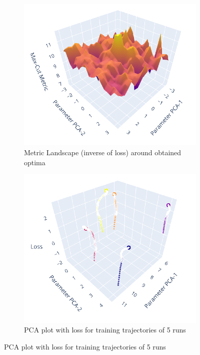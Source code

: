 \documentclass[%
 reprint,
 amsmath,
 amssymb,
 showkeys,
 pra,
 floatfix,
 onecolumn,
]{revtex4-2}
\begin{document}
\begin{figure}[htp]
    \centering
    \begin{subfigure}[b]{0.48\linewidth}
        \includegraphics[width=\textwidth]{images/supplementary-qleet-1.pdf}
        \caption{Metric Landscape (inverse of loss) around obtained optima}
    \end{subfigure}
    \begin{subfigure}[b]{0.48\linewidth}
        \includegraphics[width=\textwidth]{images/supplementary-qleet-2.pdf}
        \caption{PCA plot with loss for training trajectories of 5 runs}

\end{subfigure}
\end{figure}
\end{document}
